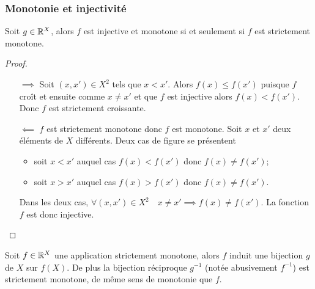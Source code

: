 \subsubsection{Monotonie et injectivité}
\begin{theo}
  Soit \(g \in \mathbb{R}^X\), alors \(f\) est injective et monotone si et seulement si
  \(f\) est strictement monotone.
\end{theo}
\begin{proof}
  \begin{itemize}
    \item[\(\implies\)] Soit \((x,x') \in X^2\) tels que \(x < x'\). Alors
      \(f(x) \leqslant f(x')\) puisque \(f\) croît et ensuite comme \(x \neq
      x'\) et que \(f\) est injective alors \(f(x) < f(x')\). Donc \(f\) est
      strictement croissante.
    \item[\(\impliedby\)] \(f\) est strictement monotone donc \(f\) est
      monotone. Soit \(x\) et \(x'\) deux éléments de \(X\) différents. Deux cas
      de figure se présentent
      \begin{itemize}
        \item soit \(x < x'\) auquel cas \(f(x) < f(x')\) donc \(f(x) \neq
          f(x')\);
        \item soit \(x > x'\) auquel cas \(f(x) > f(x')\) donc \(f(x) \neq
          f(x')\).
      \end{itemize}
      Dans les deux cas, \(\forall (x,x') \in X^2 \quad x \neq x' \implies f(x)
      \neq f(x')\). La fonction \(f\) est donc injective.
  \end{itemize}
\end{proof}
\begin{cor}
  Soit \(f \in \mathbb{R}^X\) une application strictement monotone, alors \(f\) induit
  une bijection \(g\) de \(X\) sur \(f(X)\). De plus la bijection réciproque
  \(g^{-1}\) (notée abusivement \(f^{-1}\)) est strictement monotone, de même
  sens de monotonie que \(f\).
\end{cor}
